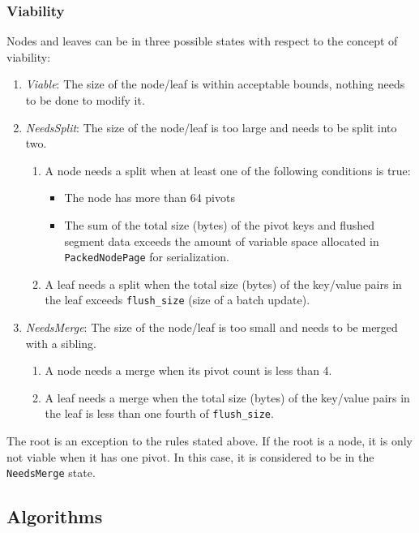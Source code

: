 \documentclass[11pt]{article}
\begin{document}
\subsubsection{Viability}
Nodes and leaves can be in three possible states with respect to the concept of viability:
\begin{enumerate}
    \item \textit{Viable}: The size of the node/leaf is within acceptable bounds, nothing needs to be done to modify it.
    \item \textit{NeedsSplit}: The size of the node/leaf is too large and needs to be split into two.
        \begin{enumerate}
        \item A node needs a split when at least one of the following conditions is true:
            \begin{itemize}
                \item The node has more than 64 pivots
                \item The sum of the total size (bytes) of the pivot keys and flushed segment data exceeds the amount of variable space allocated in \texttt{PackedNodePage} for serialization.
            \end{itemize}
        \item A leaf needs a split when the total size (bytes) of the key/value pairs in the leaf exceeds \texttt{flush\_size} (size of a batch update).
        \end{enumerate}
    \item \textit{NeedsMerge}: The size of the node/leaf is too small and needs to be merged with a sibling.
        \begin{enumerate}
            \item A node needs a merge when its pivot count is less than 4.
            \item A leaf needs a merge when the total size (bytes) of the key/value pairs in the leaf is less than one fourth of \texttt{flush\_size}.
        \end{enumerate}
\end{enumerate}

The root is an exception to the rules stated above. If the root is a node, it is only not viable when it has one pivot. In this
case, it is considered to be in the \texttt{NeedsMerge} state.

\subsection{Algorithms}
\end{document}
